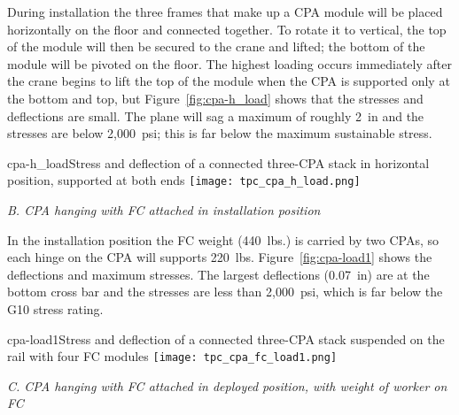 During installation the three frames that make up a CPA module will be placed horizontally on the floor and connected together.  To rotate it to vertical, the top of the module will then be secured to the crane and lifted; the bottom of the module will be pivoted on the floor.  The highest loading occurs immediately after the crane begins to lift the top of the module when the CPA is supported only at the bottom and top, but Figure~\ref{fig:cpa-h_load} shows that the stresses and deflections are small.   The plane will sag a maximum of roughly 2~in and the stresses are below 2,000~psi; this is far below the maximum sustainable stress.  

\begin{cdrfigure}{cpa-h_load}{Stress and deflection of a connected three-CPA stack in horizontal position, supported at both ends} 
\texttt{[image: tpc\_cpa\_h\_load.png]}
\end{cdrfigure}


{\it  B. CPA hanging with FC attached in installation position}


In the installation position the FC weight (440~lbs.) is carried by two CPAs, so each hinge on the CPA will supports 220~lbs.  Figure~\ref{fig:cpa-load1}  shows the deflections and maximum stresses.  The largest deflections (0.07~in) are at the bottom cross bar and the stresses are less than 2,000~psi, which is far below the G10 stress rating.

\begin{cdrfigure}{cpa-load1}{Stress and deflection of a connected three-CPA stack suspended on the rail with four FC modules} 
\texttt{[image: tpc\_cpa\_fc\_load1.png]}
\end{cdrfigure}


{\it  C. CPA hanging with FC attached in deployed position, with weight of worker on FC}


